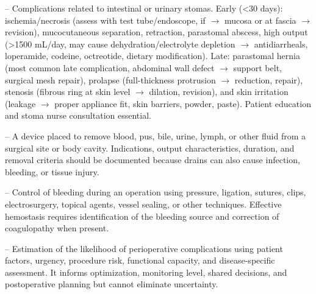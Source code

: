 -- Complications related to intestinal or urinary stomas. Early (<30 days): ischemia/necrosis (assess with test tube/endoscope, if $\rightarrow$ mucosa or at fascia $\rightarrow$ revision), mucocutaneous separation, retraction, parastomal abscess, high output (>1500 mL/day, may cause dehydration/electrolyte depletion $\rightarrow$ antidiarrheals, loperamide, codeine, octreotide, dietary modification). Late: parastomal hernia (most common late complication, abdominal wall defect $\rightarrow$ support belt, surgical mesh repair), prolapse (full-thickness protrusion $\rightarrow$ reduction, repair), stenosis (fibrous ring at skin level $\rightarrow$ dilation, revision), and skin irritation (leakage $\rightarrow$ proper appliance fit, skin barriers, powder, paste). Patient education and stoma nurse consultation essential.

-- A device placed to remove blood, pus, bile, urine, lymph, or other fluid from a surgical site or body cavity. Indications, output characteristics, duration, and removal criteria should be documented because drains can also cause infection, bleeding, or tissue injury.

-- Control of bleeding during an operation using pressure, ligation, sutures, clips, electrosurgery, topical agents, vessel sealing, or other techniques. Effective hemostasis requires identification of the bleeding source and correction of coagulopathy when present.

-- Estimation of the likelihood of perioperative complications using patient factors, urgency, procedure risk, functional capacity, and disease-specific assessment. It informs optimization, monitoring level, shared decisions, and postoperative planning but cannot eliminate uncertainty.


